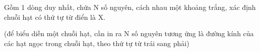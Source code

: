 Gồm 1 dòng duy nhất, chứa N số nguyên, cách nhau một khoảng trắng, xác định chuỗi hạt có thứ tự từ điển là X.  

   (để biểu diễn một chuỗi hạt, cần in ra N số nguyên tương ứng là đường kính của các hạt ngọc trong chuỗi hạt, theo thứ tự từ trái sang phải)